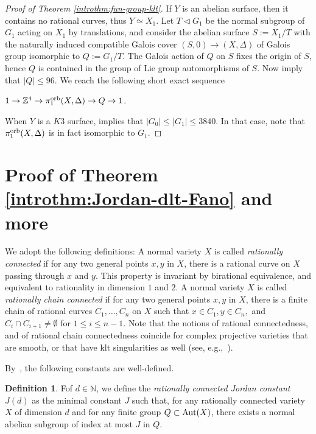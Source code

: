 \documentclass{amsart}
\newcommand{\nn}{\mathbb{N}}
\theoremstyle{definition}
\newtheorem{definition}[theorem]{Definition}
\theoremstyle{remark}
\numberwithin{equation}{section}
\begin{document}
\begin{proof}[Proof of Theorem \ref{introthm:fun-group-klt}]
If $Y$ is an abelian surface, then it contains no rational curves, thus $Y\simeq X_1$.
Let $T\triangleleft G_1$ be the normal subgroup of $G_1$ acting on $X_1$ by translations, and consider the abelian surface $S:=X_1/T$ with the naturally induced compatible Galois cover $(S,0)\rightarrow (X,\Delta)$ of Galois group isomorphic to $Q:=G_1/T$. The Galois action of $Q$ on $S$ fixes the origin of $S$, hence $Q$ is contained in the group of Lie group automorphisms of $S$. Now \cite[Lemma~3.2 and 3.3]{Fujiki88} imply that $|Q|\leq 96$. We reach the following short exact sequence
\begin{center}
    $1\rightarrow \mathbb{Z}^4 \rightarrow \pi_1^{\rm orb}(X,\Delta)\rightarrow Q\rightarrow 1$.
\end{center}

When $Y$ is a $K3$ surface, \cite[Theorem~1]{Kondo99} implies that $|G_0|\le |G_1|\leq 3840$. In that case, note that $\pi_1^{\rm orb}(X,\Delta)$ is in fact isomorphic to $G_1$.
\end{proof}


\section{Proof of Theorem \ref{introthm:Jordan-dlt-Fano} and more}\label{sec:Jordan}

We adopt the following definitions: A normal variety $X$ is called {\it rationally connected} if for any two general points $x,y$ in $X$, there is a rational curve on $X$ passing through $x$ and $y$. This property is invariant by birational equivalence, and equivalent to rationality in dimension $1$ and $2$.
A normal variety $X$ is called {\it rationally chain connected} if for any two general points $x,y$ in $X$, there is a finite chain of rational curves $C_1,\ldots, C_n$ on $X$ such that $x\in C_1,y\in C_n,$ and $C_i\cap C_{i+1}\neq\emptyset$ for $1\le i\le n-1$. Note that the notions of rational connectedness, and of rational chain connectedness coincide for complex projective varieties that are smooth, or that have klt singularities as well (see, e.g.,~\cite[Theorem IV.3.10]{Kol96}).

By~\cite[Theorem 1.8]{PS14}, the following constants are well-defined.
\begin{definition}
    Fof $d\in\nn$, we define the {\it rationally connected Jordan constant} $J(d)$ as the minimal constant $J$ such that, for any rationally connected variety $X$ of dimension $d$ and for any finite group $Q\subset {\rm Aut}(X)$, there exists a normal abelian subgroup of index at most $J$ in $Q$.
\end{definition}
\end{document}
